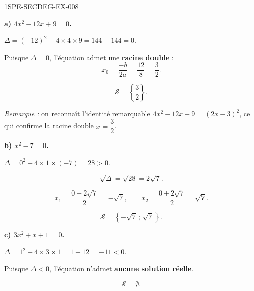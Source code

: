 \begin{corrige}{1SPE-SECDEG-EX-008}

\textbf{a) $4x^2 - 12x + 9 = 0$.}


$\Delta = (-12)^2 - 4 \times 4 \times 9 = 144 - 144 = 0$.

Puisque $\Delta = 0$, l'équation admet une \textbf{racine double} :
\[x_0 = \frac{-b}{2a} = \frac{12}{8} = \frac{3}{2}.\]

\[\boxed{\mathcal{S} = \left\{\frac{3}{2}\right\}.}\]

\textit{Remarque :} on reconnaît l'identité remarquable $4x^2 - 12x + 9 = (2x-3)^2$, ce qui confirme la racine double $x = \dfrac{3}{2}$.

\medskip
\textbf{b) $x^2 - 7 = 0$.}


$\Delta = 0^2 - 4 \times 1 \times (-7) = 28 > 0$.

\[\sqrt{\Delta} = \sqrt{28} = 2\sqrt{7}.\]

\[x_1 = \frac{0 - 2\sqrt{7}}{2} = -\sqrt{7}, \qquad x_2 = \frac{0 + 2\sqrt{7}}{2} = \sqrt{7}.\]

\[\boxed{\mathcal{S} = \left\{-\sqrt{7}\,;\,\sqrt{7}\right\}.}\]

\medskip
\textbf{c) $3x^2 + x + 1 = 0$.}


$\Delta = 1^2 - 4 \times 3 \times 1 = 1 - 12 = -11 < 0$.

Puisque $\Delta < 0$, l'équation n'admet \textbf{aucune solution réelle}.

\[\boxed{\mathcal{S} = \emptyset.}\]

\end{corrige}
